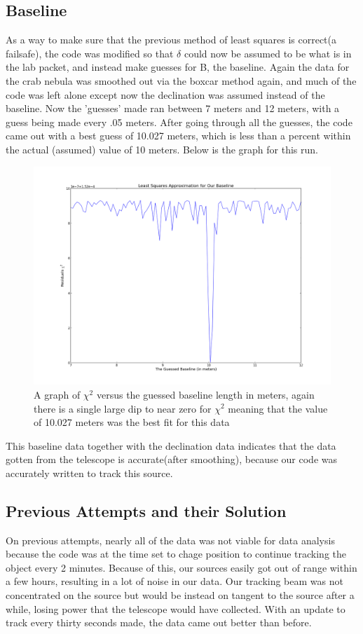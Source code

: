\documentclass[12 pt]{article}
\begin{document}
\subsection*{Baseline}
As a way to make sure that the previous method of least squares is
correct(a failsafe), the code was modified so that $\delta$ could now be assumed to
be what is in the lab packet, and instead make guesses for B, the
baseline. Again the data for the crab nebula was smoothed out via the
boxcar method again, and much of the code was left alone except now the
declination was assumed instead of the baseline. Now the 'guesses'
made ran between 7 meters and 12 meters, with a guess being made every
.05 meters. After going through all the guesses, the code came out with
a best guess of 10.027 meters, which is less than a percent within the
actual (assumed) value of 10 meters. Below is the graph for this run.
\begin{figure}[H]
\centering
\includegraphics[scale=0.45]{crabbaseline.png}
\caption{A graph of $\chi^2$ versus the guessed baseline length in
  meters, again there is a single large dip to near zero for $\chi^2$
  meaning that the value of 10.027 meters was the best fit for this data}
\label{crabbaseline}
\end{figure}
This baseline data together with the declination data indicates that the
data gotten from the telescope is accurate(after smoothing), because our code was
accurately written to track this source.\par
\subsection*{Previous Attempts and their Solution}
 On previous attempts, nearly all of the data was not viable for data
 analysis because the code was at the time set to chage position to
 continue tracking the object every 2 minutes. Because of this, our
 sources easily got out of range within a few hours, resulting in a lot
 of noise in our data. Our tracking beam
 was not concentrated on the source but would be instead on tangent
 to the source after a while, losing power that the telescope would have
 collected. With an update to track every thirty seconds made, the data came
 out better than before. 
\end{document}
